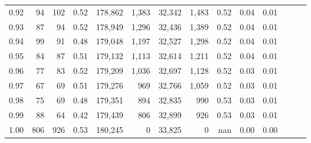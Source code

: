 \begin{tabular}{rrrrrrrrrrrrrr}
0.92 &     94 &  102 &  0.52 &  178,862 &    1,383 &  32,342 &   1,483 &  0.52 &  0.04 &      0.01 \\
0.93 &     87 &   94 &  0.52 &  178,949 &    1,296 &  32,436 &   1,389 &  0.52 &  0.04 &      0.01 \\
0.94 &     99 &   91 &  0.48 &  179,048 &    1,197 &  32,527 &   1,298 &  0.52 &  0.04 &      0.01 \\
0.95 &     84 &   87 &  0.51 &  179,132 &    1,113 &  32,614 &   1,211 &  0.52 &  0.04 &      0.01 \\
0.96 &     77 &   83 &  0.52 &  179,209 &    1,036 &  32,697 &   1,128 &  0.52 &  0.03 &      0.01 \\
0.97 &     67 &   69 &  0.51 &  179,276 &      969 &  32,766 &   1,059 &  0.52 &  0.03 &      0.01 \\
0.98 &     75 &   69 &  0.48 &  179,351 &      894 &  32,835 &     990 &  0.53 &  0.03 &      0.01 \\
0.99 &     88 &   64 &  0.42 &  179,439 &      806 &  32,899 &     926 &  0.53 &  0.03 &      0.01 \\
1.00 &    806 &  926 &  0.53 &  180,245 &        0 &  33,825 &       0 &   nan &  0.00 &      0.00 \\
\bottomrule
\end{tabular}
